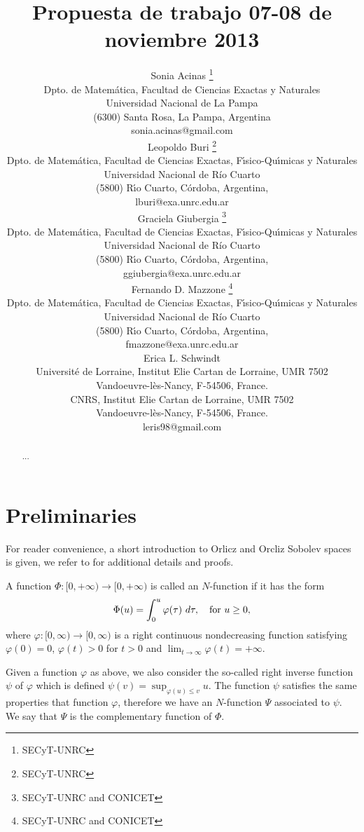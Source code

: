 \documentclass[twoside]{article}
\title{Propuesta de trabajo 07-08 de noviembre 2013}
\author{Sonia Acinas \thanks{SECyT-UNRC}\\
Dpto. de Matem\'atica, Facultad de Ciencias Exactas y Naturales\\
Universidad Nacional de La Pampa\\
(6300) Santa Rosa, La Pampa, Argentina\\
sonia.acinas@gmail.com\\[3mm]
Leopoldo Buri \thanks{SECyT-UNRC}\\
Dpto. de Matem\'atica, Facultad de Ciencias Exactas, F\'{\i}sico-Qu\'{\i}micas y Naturales\\
Universidad Nacional de R\'{i}o Cuarto\\
(5800) R\'{\i}o Cuarto, C\'ordoba, Argentina,\\
lburi@exa.unrc.edu.ar\\[3mm]
Graciela Giubergia \thanks{SECyT-UNRC and CONICET}\\
Dpto. de Matem\'atica, Facultad de Ciencias Exactas, F\'{\i}sico-Qu\'{\i}micas y Naturales\\
Universidad Nacional de R\'{i}o Cuarto\\
(5800) R\'{\i}o Cuarto, C\'ordoba, Argentina,\\
ggiubergia@exa.unrc.edu.ar\\[3mm]
Fernando D. Mazzone \thanks{SECyT-UNRC and CONICET}\\
Dpto. de Matem\'atica, Facultad de Ciencias Exactas, F\'{\i}sico-Qu\'{\i}micas y Naturales\\
Universidad Nacional de R\'{i}o Cuarto\\
(5800) R\'{\i}o Cuarto, C\'ordoba, Argentina,\\
fmazzone@exa.unrc.edu.ar\\[3mm]
Erica L. Schwindt\\
Universit\'e de Lorraine, Institut Elie Cartan de Lorraine, UMR 7502\\
Vandoeuvre-l\`es-Nancy, F-54506, France.\\
CNRS, Institut Elie Cartan de Lorraine, UMR 7502 \\
Vandoeuvre-l\`es-Nancy, F-54506, France.\\
leris98@gmail.com}
\date{}
\begin{document}
\maketitle
%
\begingroup%
    \renewcommand{\thefootnote}{}%
    \endgroup
%
%
%
%

\begin{abstract}
...
\end{abstract}




\pagestyle{fancy} \headheight 35pt \fancyhead{} \fancyfoot{}

\fancyfoot[C]{\thepage}  \fancyhead[CO]{\nouppercase{\section}}

\fancyhead[CO]{\nouppercase{\leftmark}}



\section{Preliminaries}

For reader convenience, a short introduction to Orlicz and Orcliz Sobolev spaces is given, we refer to \cite{adams_sobolev,KR} for additional details and proofs.

A function $\Phi:[0,+\infty)\to [0,+\infty)$ is called an $N$-function if it has the form
\[
\Phi(u)=\int_{0}^u \varphi(\tau)\ d\tau,\quad\hbox{for } u\geq 0,
\]
where $\varphi: [0, \infty)\rightarrow [0, \infty)$ is a right continuous nondecreasing function  satisfying   $\varphi(0)=0$, $\varphi(t)>0$ for $t>0$ and
$\lim_{t\rightarrow \infty}\varphi(t)=+\infty$.

Given a function $\varphi$ as above, we also consider the so-called right inverse function $\psi$ of $\varphi$ which is defined $\psi(v)=\sup_{\varphi(u)\leq v}u$.
The function $\psi$ satisfies the same properties that function $\varphi$, therefore we have an $N$-function $\Psi$ associated to $\psi$. We say that $\Psi$ is the
complementary function of $\Phi$.
\end{document}
